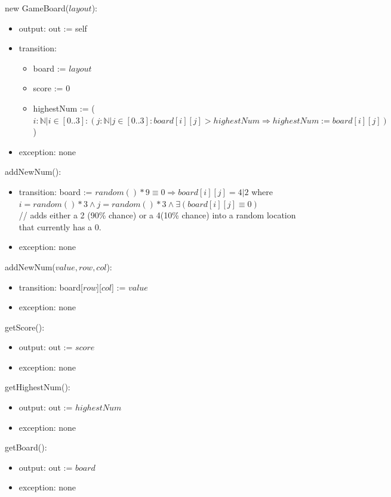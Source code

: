 \documentclass[12pt]{article}
\begin{document}
\noindent new GameBoard($layout$):
\begin{itemize}
    \item output: out := self 
    \item transition: 
    \begin{itemize}
        \item board := $layout$
        \item score := 0
        \item highestNum := ($i : \mathbb{N} \vert i
        \in [0..3]: (j : \mathbb{N} \vert j \in [0..3]:
        board[i][j] > highestNum \Rightarrow highestNum := board[i][j])$)
    \end{itemize}
    \item exception: none
\end{itemize}

\noindent addNewNum():
\begin{itemize}
    \item transition: board := $random() * 9 \equiv 0 \Rightarrow
    board[i][j] = 4 | 2$ where $i = random() * 3 \land j = random() * 3
    \land \exists(board[i][j] \equiv 0)$\\
    // adds either a 2 (90\% chance) or a 4(10\% chance) into a random
    location that currently has a 0.
    \item exception: none
\end{itemize}

\noindent addNewNum($value, row, col$):
\begin{itemize}
    \item transition: board[$row$][$col$] := $value$
    \item exception: none
\end{itemize}

\noindent getScore():
\begin{itemize}
    \item output: out := $score$
    \item exception: none
\end{itemize}

\noindent getHighestNum():
\begin{itemize}
    \item output: out := $highestNum$
    \item exception: none
\end{itemize}

\noindent getBoard():
\begin{itemize}
    \item output: out := $board$
    \item exception: none
\end{itemize}
\end{document}

